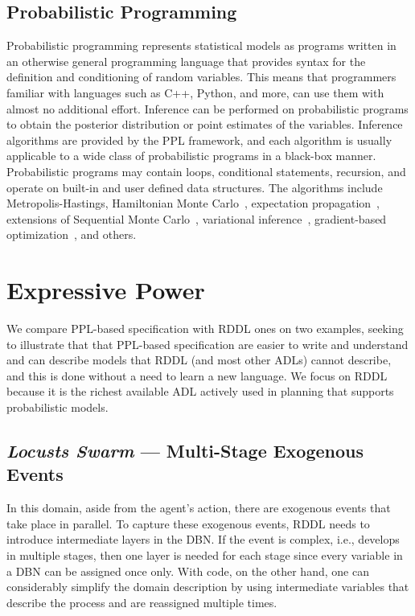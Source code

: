 \documentclass[letterpaper]{article} %
\theoremstyle{definition}
\begin{document}
\subsection{Probabilistic Programming}
Probabilistic programming \cite{GMR+08,MSP14,WVM14,GS15}
  represents statistical models as programs written in an
  otherwise general programming language that provides syntax
  for the definition and conditioning of random variables.
  This means that programmers familiar with languages
  such as C++, Python, and more, can use them with almost no
  additional effort. 
  Inference can be performed on probabilistic programs to
  obtain the posterior distribution or point estimates of the
  variables. Inference algorithms are provided by the
  PPL framework, and each algorithm is
  usually applicable to a wide class of probabilistic programs
  in a black-box manner. Probabilistic programs may contain loops, conditional
  statements, recursion, and operate on built-in and user
  defined data structures. The algorithms include
  Metropolis-Hastings\cite{MSP14,YHG14}, Hamiltonian
  Monte Carlo~\cite{Stan17}, expectation
  propagation~\cite{MWG+10}, extensions of Sequential Monte
  Carlo~\cite{WVM14,MYM+15,PWD+14,RNL+2016,MS18}, variational
  inference~\cite{WW13,KTR+17}, gradient-based
  optimization~\cite{Stan17,BCJ+19}, and others.



\section{Expressive Power}
We compare PPL-based specification with RDDL ones on two examples, seeking to illustrate that that PPL-based specification are easier to write and understand and can describe models that RDDL (and most other ADLs) cannot describe, and this is done without a need to learn a new language. 
We focus on RDDL because it is the richest available ADL actively used in planning that supports probabilistic models. %

\subsection{{\em Locusts Swarm} --- Multi-Stage Exogenous Events} 
In this domain, aside from the agent's action, there are exogenous events that take place in parallel. To capture these exogenous events, RDDL needs to introduce intermediate layers in the DBN. If the event is complex, i.e., develops in multiple stages, then one layer is needed for each stage since every variable in a DBN can be assigned once only. With code, on the other hand, one can considerably simplify the domain description by using intermediate variables that describe the process and are reassigned multiple times.
\end{document}
